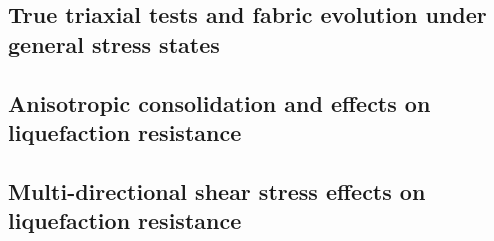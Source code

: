 \documentclass[../main]{subfiles}
\begin{document}
\subsection{True triaxial tests and fabric evolution under general stress states}
\label{subsec:dem_triaxial}

\subsection{Anisotropic consolidation and \Kzero{} effects on liquefaction resistance}
\label{subsec:dem_k0}

\subsection{Multi-directional shear stress effects on liquefaction resistance}
\label{subsec:dem_multidir}
\end{document}
